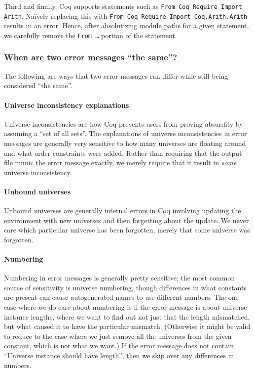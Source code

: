 \documentclass[a4paper,UKenglish,anonymous,cleveref,autoref,thm-restate]{lipics-v2021}
\begin{document}
Third and finally, Coq supports statements such as \verb|From Coq Require Import Arith|.
Na\"ively replacing this with \verb|From Coq Require Import Coq.Arith.Arith| results in an error.
Hence, after absolutizing module paths for a given statement, we carefully remove the \texttt{From \ldots} portion of the statement.

\subsubsection{When are two error messages ``the same''?}
The following are ways that two error messages can differ while still being considered ``the same''.

\paragraph{Universe inconsistency explanations}
Universe inconsistencies are how Coq prevents users from proving absurdity by assuming a ``set of all sets''.
The explanations of universe inconsistencies in error messages are generally very sensitive to how many universes are floating around and what order constraints were added.
Rather than requiring that the output file mimic the error message exactly, we merely require that it result in \emph{some} universe inconsistency.

\paragraph{Unbound universes}
Unbound universes are generally internal errors in Coq involving updating the environment with new universes and then forgetting about the update.
We never care which particular universe has been forgotten, merely that some universe was forgotten.

\paragraph{Numbering}
Numbering in error messages is generally pretty sensitive; the most common source of sensitivity is universe numbering, though differences in what constants are present can cause autogenerated names to use different numbers.
The one case where we do care about numbering is if the error message is about universe instance lengths, where we want to find out not just that the length mismatched, but what caused it to have the particular mismatch.
(Otherwise it might be valid to reduce to the case where we just remove all the universes from the given constant, which is not what we want.)
If the error message does not contain ``Universe instance should have length'', then we skip over any differences in numbers.
\end{document}
